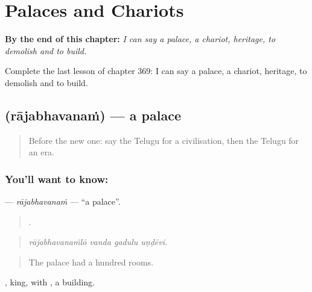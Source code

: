 
\chapter{Palaces and Chariots}
\label{ch:te-palaces-and-chariots}

\begin{chapteropening}
\textbf{By the end of this chapter:} \emph{I can say a palace, a chariot, heritage, to demolish and to build.}

Complete the last lesson of chapter 369: I can say a palace, a chariot, heritage, to demolish and to build.
\end{chapteropening}

\section[\texorpdfstring{\te{రాజభవనం} (rājabhavanaṁ)}{రాజభవనం (rājabhavanaṁ)}]{ (rājabhavanaṁ) — a palace}

\label{lesson:TE-C369-rajabhavanam}



\begin{quote}
Before the new one: say the Telugu for a civilisation, then the Telugu for an era.
\end{quote}

\subsection*{You'll want to know: }
\textbf{} — \emph{rājabhavanaṁ} — \textquotedblleft{}a palace\textquotedblright{}.

\begin{quote}
   .
\end{quote}

\begin{quote}
\emph{rājabhavanaṁlō vanda gadulu uṇḍēvi.}
\end{quote}

\begin{quote}
The palace had a hundred rooms.
\end{quote}

, king, with , a building.

